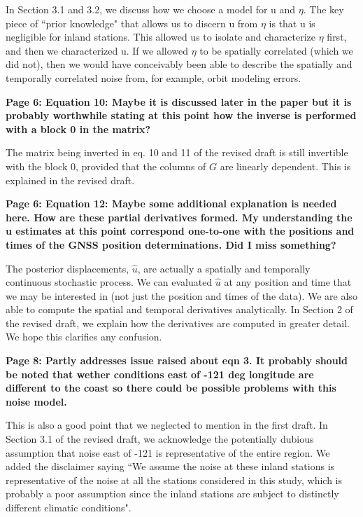 \documentclass[10pt,a4paper]{letter}
\begin{document}
\begin{letter}{}
In Section 3.1 and 3.2, we discuss how we choose a model for u and
$\eta$. The key piece of ``prior knowledge" that allows us to discern u
from $\eta$ is that u is negligible for inland stations. This allowed us
to isolate and characterize $\eta$ first, and then we characterized u. If
we allowed $\eta$ to be spatially correlated (which we did not), then we
would have conceivably been able to describe the spatially and
temporally correlated noise from, for example, orbit modeling errors.

\textbf{Page 6: Equation 10: Maybe it is discussed later in the paper but it
is probably worthwhile stating at this point how the inverse is
performed with a block 0 in the matrix?}

The matrix being inverted in eq. 10 and 11 of the revised draft is
still invertible with the block 0, provided that the columns of
$G$ are linearly dependent. This is explained in the revised
draft.

\textbf{Page 6: Equation 12: Maybe some additional explanation is
needed here. How are these partial derivatives formed.  My
understanding the u estimates at this point correspond one-to-one with
the positions and times of the GNSS position determinations.  Did I
miss something?}

The posterior displacements, $\hat{u}$, are actually a spatially and
temporally continuous stochastic process. We can evaluated $\hat{u}$
at any position and time that we may be interested in (not just the
position and times of the data). We are also able to compute the
spatial and temporal derivatives analytically. In Section 2 of the
revised draft, we explain how the derivatives are computed in greater
detail. We hope this clarifies any confusion.

\textbf{Page 8: Partly addresses issue raised about eqn 3.  It
probably should be noted that wether conditions east of -121 deg
longitude are different to the coast so there could be possible
problems with this noise model.}

This is also a good point that we neglected to mention in the first
draft. In Section 3.1 of the revised draft, we acknowledge the
potentially dubious assumption that noise east of -121 is
representative of the entire region. We added the disclaimer saying
``We assume the noise at these inland stations is representative of the
noise at all the stations considered in this study, which is probably
a poor assumption since the inland stations are subject to distinctly
different climatic conditions".


\end{letter}
\end{document}
